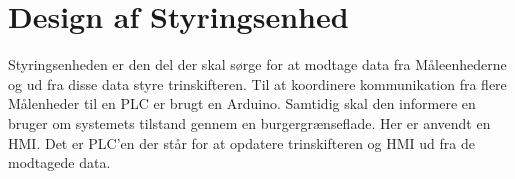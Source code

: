 
\chapter{Design af Styringsenhed}

Styringsenheden er den del der skal sørge for at modtage data fra Måleenhederne og ud fra disse data styre trinskifteren. Til at koordinere kommunikation fra flere Målenheder til en PLC er brugt en Arduino. Samtidig skal den informere en bruger om systemets tilstand gennem en burgergrænseflade. Her er anvendt en HMI. Det er PLC'en der står for at opdatere trinskifteren og HMI ud fra de modtagede data.


